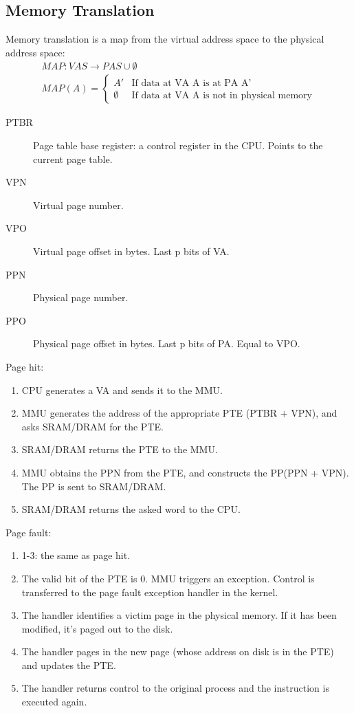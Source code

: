 \subsection{Memory Translation}
Memory translation is a map from the virtual address space to the physical address space:
\begin{gather*}
MAP:VAS\rightarrow PAS\cup\emptyset\\
MAP(A)=\begin{cases}
A'&\text{If data at VA A is at PA A'}\\
\emptyset&\text{If data at VA A is not in physical memory}
\end{cases}
\end{gather*}
\begin{description}
	\item[PTBR]Page table base register: a control register in the CPU. Points to the current page table.
	\item[VPN]Virtual page number.
	\item[VPO]Virtual page offset in bytes. Last p bits of VA.
	\item[PPN]Physical page number.
	\item[PPO]Physical page offset in bytes. Last p bits of PA. Equal to VPO.
\end{description}
Page hit:
\begin{enumerate}
	\item CPU generates a VA and sends it to the MMU.
	\item MMU generates the address of the appropriate PTE (PTBR + VPN), and asks SRAM/DRAM for the PTE.
	\item SRAM/DRAM returns the PTE to the MMU.
	\item MMU obtains the PPN from the PTE, and constructs the PP(PPN + VPN). The PP is sent to SRAM/DRAM.
	\item SRAM/DRAM returns the asked word to the CPU.
\end{enumerate}
Page fault:
\begin{enumerate}
	\item 1-3: the same as page hit.
	\item The valid bit of the PTE is 0. MMU triggers an exception. Control is transferred to the page fault exception handler in the kernel.
	\item The handler identifies a victim page in the physical memory. If it has been modified, it's paged out to the disk.
	\item The handler pages in the new page (whose address on disk is in the PTE) and updates the PTE.
	\item The handler returns control to the original process and the instruction is executed again.
\end{enumerate}
